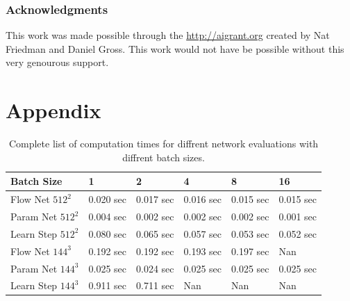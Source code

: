 \documentclass{article} %
\begin{document}
\subsubsection*{Acknowledgments}

This work was made possible through the \url{http://aigrant.org} created by Nat Friedman and Daniel Gross. This work would not have be possible without this very genourous support.




\section{Appendix}

\begin{table}[t]
\caption{Complete list of computation times for diffrent network evaluations with diffrent batch sizes.}
\label{computation_table}
\begin{center}
\begin{tabular}{l|lllll}
Batch Size & 1 & 2 & 4 & 8 & 16 \\ \hline 
Flow Net $512^2$ & 0.020 sec & 0.017 sec & 0.016 sec & 0.015 sec & 0.015 sec \\ 
Param Net $512^2$ & 0.004 sec & 0.002 sec & 0.002 sec & 0.002 sec & 0.001 sec \\ 
Learn Step $512^2$ & 0.080 sec & 0.065 sec & 0.057 sec & 0.053 sec & 0.052 sec \\ 
Flow Net $144^3$ & 0.192 sec & 0.192 sec & 0.193 sec & 0.197 sec & Nan \\ 
Param Net $144^3$ & 0.025 sec & 0.024 sec & 0.025 sec & 0.025 sec & 0.025 sec \\ 
Learn Step $144^3$ & 0.911 sec & 0.711 sec & Nan & Nan & Nan \\ 
\end{tabular}
\end{center}
\end{table}
\end{document}
